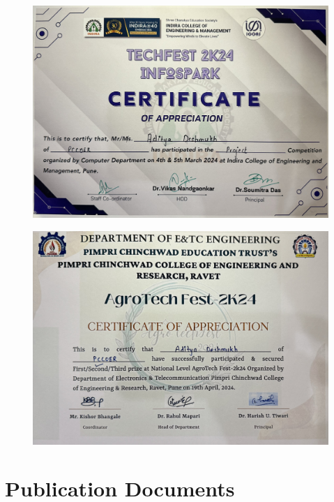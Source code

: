 \documentclass[12pt,a4paper]{report}
\begin{document}
\begin{figure}[!htb]
\begin{center}
\includegraphics[scale=0.095]{images/certificates/certificates/Aditya1.jpg}
\end{center}
\end{figure}
\begin{figure}[!htb]
\begin{center}
\includegraphics[scale=0.095]{images/certificates/certificates/Aditya2.jpg}
\end{center}
\end{figure}    
\newpage

\section {Publication Documents}
\end{document}
